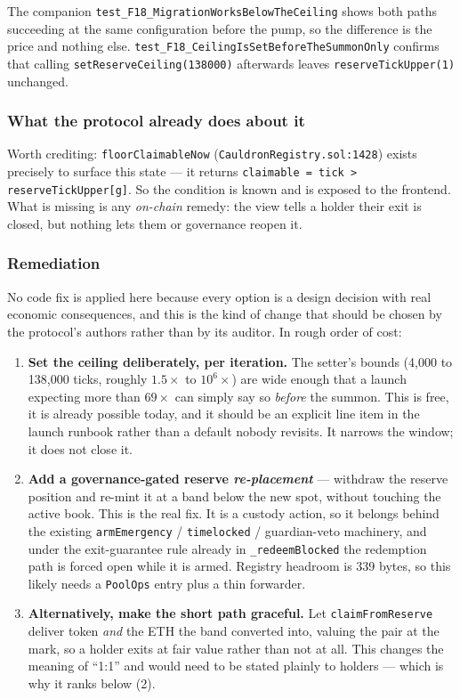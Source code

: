 \documentclass[11pt,a4paper]{article}
\newcommand{\code}[1]{\texttt{\small #1}}
\newcommand{\fileref}[1]{\texttt{\scriptsize #1}}
\begin{document}
The companion \code{test\_F18\_MigrationWorksBelowTheCeiling} shows both paths
succeeding at the same configuration before the pump, so the difference is the
price and nothing else. \code{test\_F18\_CeilingIsSetBeforeTheSummonOnly} confirms
that calling \code{setReserveCeiling(138000)} afterwards leaves
\code{reserveTickUpper(1)} unchanged.

\subsubsection*{What the protocol already does about it}

Worth crediting: \code{floorClaimableNow} (\fileref{CauldronRegistry.sol:1428})
exists precisely to surface this state --- it returns
\code{claimable = tick > reserveTickUpper[g]}. So the condition is known and is
exposed to the frontend. What is missing is any \emph{on-chain} remedy: the view
tells a holder their exit is closed, but nothing lets them or governance reopen it.

\subsubsection*{Remediation}

No code fix is applied here because every option is a design decision with real
economic consequences, and this is the kind of change that should be chosen by the
protocol's authors rather than by its auditor. In rough order of cost:

\begin{enumerate}
\item \textbf{Set the ceiling deliberately, per iteration.} The setter's bounds
(4{,}000 to 138{,}000 ticks, roughly $1.5\times$ to $10^6\times$) are wide enough
that a launch expecting more than $69\times$ can simply say so \emph{before} the
summon. This is free, it is already possible today, and it should be an explicit
line item in the launch runbook rather than a default nobody revisits. It narrows
the window; it does not close it.

\item \textbf{Add a governance-gated reserve \emph{re-placement}} --- withdraw the
reserve position and re-mint it at a band below the new spot, without touching the
active book. This is the real fix. It is a custody action, so it belongs behind the
existing \code{armEmergency} / \code{timelocked} / guardian-veto machinery, and
under the exit-guarantee rule already in \code{\_redeemBlocked} the redemption path
is forced open while it is armed. Registry headroom is 339 bytes, so this likely
needs a \code{PoolOps} entry plus a thin forwarder.

\item \textbf{Alternatively, make the short path graceful.} Let
\code{claimFromReserve} deliver token \emph{and} the ETH the band converted into,
valuing the pair at the mark, so a holder exits at fair value rather than not at
all. This changes the meaning of ``1:1'' and would need to be stated plainly to
holders --- which is why it ranks below (2).
\end{enumerate}
\end{document}
